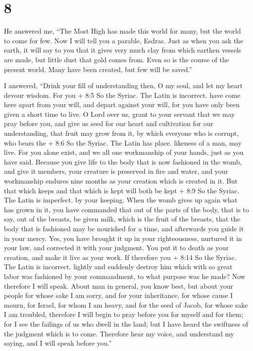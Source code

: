 \hypertarget{section-7}{%
\section{8}\label{section-7}}

 He answered me, ``The Most High has made this world for
many, but the world to come for few.  Now I will tell you a
parable, Esdras. Just as when you ask the earth, it will say to you that
it gives very much clay from which earthen vessels are made, but little
dust that gold comes from. Even so is the course of the present world.
 Many have been created, but few will be saved.''

 I answered, ``Drink your fill of understanding then, O my
soul, and let my heart devour wisdom.  For you + 8:5 So the
Syriac. The Latin is incorrect. have come here apart from your will, and
depart against your will, for you have only been given a short time to
live.  O Lord over us, grant to your servant that we may
pray before you, and give us seed for our heart and cultivation for our
understanding, that fruit may grow from it, by which everyone who is
corrupt, who bears the + 8:6 So the Syriac. The Latin has place.
likeness of a man, may live.  For you alone exist, and we
all one workmanship of your hands, just as you have said. 
Because you give life to the body that is now fashioned in the womb, and
give it members, your creature is preserved in fire and water, and your
workmanship endures nine months as your creation which is created in it.
 But that which keeps and that which is kept will both be
kept + 8:9 So the Syriac. The Latin is imperfect. by your keeping. When
the womb gives up again what has grown in it,  you have
commanded that out of the parts of the body, that is to say, out of the
breasts, be given milk, which is the fruit of the breasts, 
that the body that is fashioned may be nourished for a time, and
afterwards you guide it in your mercy.  Yes, you have
brought it up in your righteousness, nurtured it in your law, and
corrected it with your judgment.  You put it to death as
your creation, and make it live as your work.  If therefore
you + 8:14 So the Syriac. The Latin is incorrect. lightly and suddenly
destroy him which with so great labor was fashioned by your commandment,
to what purpose was he made?  Now therefore I will speak.
About man in general, you know best, but about your people for whose
sake I am sorry,  and for your inheritance, for whose cause
I mourn, for Israel, for whom I am heavy, and for the seed of Jacob, for
whose sake I am troubled,  therefore I will begin to pray
before you for myself and for them; for I see the failings of us who
dwell in the land;  but I have heard the swiftness of the
judgment which is to come.  Therefore hear my voice, and
understand my saying, and I will speak before you.''

